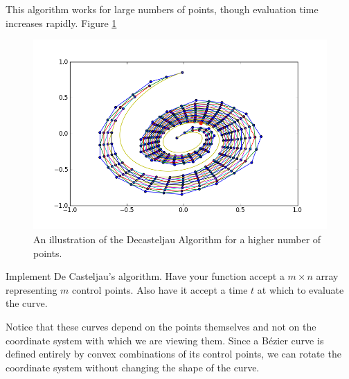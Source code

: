 This algorithm works for large numbers of points, though evaluation time increases rapidly.
Figure \ref{fig:bezier:decasteljau_many_points}

\begin{figure}
\includegraphics[width=\textwidth]{decasteljau_6}
\caption{An illustration of the Decasteljau Algorithm for a higher number of points.}
\label{fig:bezier:decasteljau_many_points}
\end{figure}

\begin{problem}
Implement De Casteljau's algorithm.
Have your function accept a $m \times n$ array representing $m$ control points.
Also have it accept a time $t$ at which to evaluate the curve.
\end{problem}

Notice that these curves depend on the points themselves and not on the coordinate system with which we are viewing them.
Since a B\'{e}zier curve is defined entirely by convex combinations of its control points, we can rotate the coordinate system without changing the shape of the curve.

